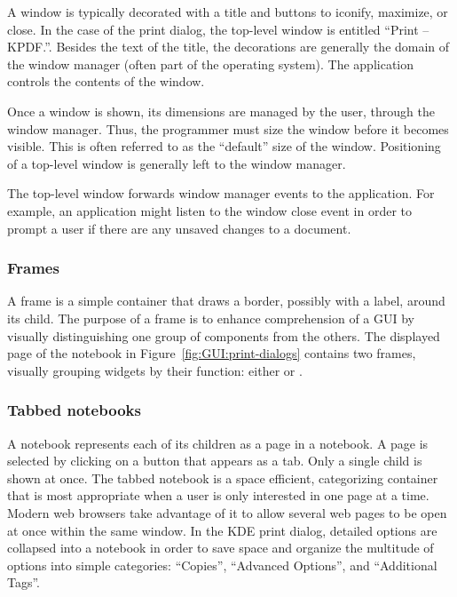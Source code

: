 A window is typically decorated with a title and buttons to iconify,
maximize, or close. In the case of the print dialog, the top-level
window is entitled ``Print -- KPDF.''. Besides the text of the title,
the decorations are generally the domain of the window manager (often
part of the operating system). The application controls the contents
of the window.

Once a window is shown, its dimensions are managed by the user,
through the window manager. Thus, the programmer must size the window
before it becomes visible. This is often referred to as the
``default'' size of the window. Positioning of a top-level window is
generally left to the window manager.

The top-level window forwards window manager events to the
application. For example, an application might listen to the window
close event in order to prompt a user if there are any unsaved changes
to a document.


\subsubsection{Frames}
\label{sec:GUI:frames}

A frame is a simple container that draws a border, possibly with a
label, around its child. The purpose of a frame is to enhance
comprehension of a GUI by visually distinguishing one group of
components from the others. The displayed page of the notebook in
Figure~\ref{fig:GUI:print-dialogs} contains two frames, visually
grouping widgets by their function: either 
or .

\subsubsection{Tabbed notebooks}
\label{sec:GUI:notebooks}

A notebook represents each of its children as a page in a notebook. A
page is selected by clicking on a button that appears as a tab. Only a
single child is shown at once. The tabbed notebook is a space
efficient, categorizing container that is most appropriate when a user
is only interested in one page at a time. Modern web browsers take
advantage of it to allow several web pages to be open at once within
the same window. In the KDE print dialog, detailed options are
collapsed into a notebook in order to save space and organize the
multitude of options into simple categories: ``Copies'', ``Advanced
Options'', and ``Additional Tags''.

